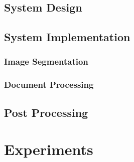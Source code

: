 \documentclass[10pt, conference, compsocconf]{IEEEtran}
\begin{document}
		\subsection{System Design}



		\subsection{System Implementation}



			\subsubsection{Image Segmentation}



			\subsubsection{Document Processing}



		\subsection{Post Processing}



	\section{Experiments}



	
		
	
		
\end{document}
